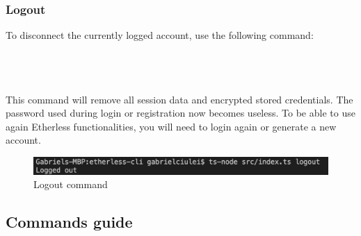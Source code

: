 \subsubsection{Logout}
To disconnect the currently logged account, use the following command:\\\\
\centerline{}\\\\
This command will remove all session data and encrypted stored credentials. The password used during login or registration now becomes useless. To be able to use again Etherless functionalities, you will need to login again or generate a new account.\\
\begin{figure}[h]
	\centering
	\includegraphics[width=\textwidth]{res/img/Screenshot_logout.png}
	\caption{Logout command}
\end{figure}
\newpage
\subsection{Commands guide}
